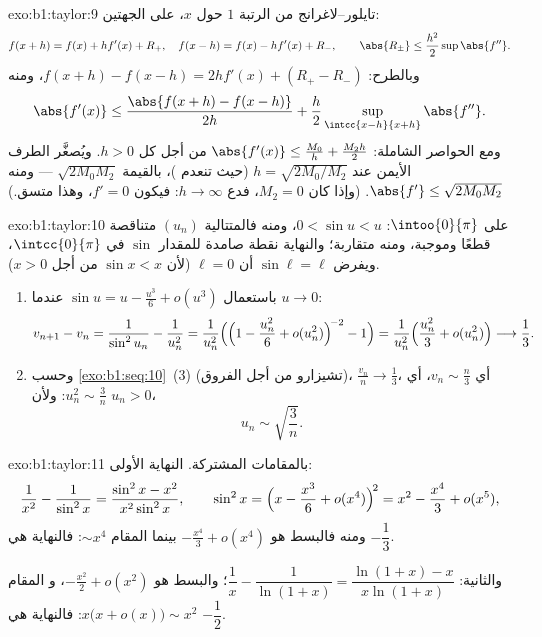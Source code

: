 \begin{solution}{exo:b1:taylor:9}
تايلور--لاغرانج من الرتبة $1$ حول $x$، على الجهتين:
\[
f(x + h) = f(x) + h f'(x) + R_+,\quad
f(x - h) = f(x) - h f'(x) + R_-,
\qquad \abs{R_\pm} \leq \frac{h^2}{2} \sup \abs{f''} .
\]
وبالطرح: $f(x+h) - f(x-h) = 2h f'(x) + (R_+ - R_-)$، ومنه
\[
\abs{f'(x)} \leq \frac{\abs{f(x+h) - f(x-h)}}{2h} +
\frac{h}{2}\sup_{\intcc{x-h}{x+h}}\abs{f''} .
\]
ومع الحواصر الشاملة: $\abs{f'(x)} \leq \frac{M_0}{h} + \frac{M_2
h}{2}$ من أجل كل $h > 0$. ويُصغَّر الطرف الأيمن عند $h =
\sqrt{2M_0/M_2}$ (حيث تنعدم )، بالقيمة $\sqrt{2M_0M_2}$
--- ومنه $\abs{f'} \leq \sqrt{2M_0M_2}$. (وإذا كان $M_2 = 0$، فدع $h \to
\infty$: فيكون $f' = 0$، وهذا متسق.)
\end{solution}

\begin{solution}{exo:b1:taylor:10}
على $\intoo{0}{\pi}$: $0 < \sin u < u$، ومنه فالمتتالية $(u_n)$ متناقصة
قطعًا وموجبة، ومنه متقاربة؛ والنهاية نقطة صامدة
للمقدار $\sin$ في $\intcc{0}{\pi}$، ويفرض $\sin \ell = \ell$ أن $\ell =
0$ (لأن $\sin x < x$ من أجل $x > 0$).
\begin{enumerate}
  \item باستعمال $\sin u = u - \frac{u^3}{6} + o(u^3)$ عندما $u \to 0$:
        \[
        v_{n+1} - v_n = \frac{1}{\sin^2 u_n} - \frac{1}{u_n^2}
        = \frac{1}{u_n^2}\Bigl(\Bigl(1 - \frac{u_n^2}{6} +
        o(u_n^2)\Bigr)^{\!-2} - 1\Bigr)
        = \frac{1}{u_n^2}\Bigl(\frac{u_n^2}{3} + o(u_n^2)\Bigr)
        \longrightarrow \frac13 .
        \]
  \item وحسب \cref{exo:b1:seq:10}~(3) (تشيزارو من أجل الفروق)،
        $\frac{v_n}{n} \to \frac13$، أي $v_n \sim \frac n3$، أي
        $u_n^2 \sim \frac 3n$: ولأن $u_n > 0$،
        \[
        u_n \sim \sqrt{\frac{3}{n}} .
        \]
\end{enumerate}
\end{solution}

\begin{solution}{exo:b1:taylor:11}
بالمقامات المشتركة. النهاية الأولى:
\[
\frac{1}{x^2} - \frac{1}{\sin^2 x}
= \frac{\sin^2 x - x^2}{x^2\sin^2 x},
\qquad
\sin^2 x = \Bigl(x - \frac{x^3}{6} + o(x^4)\Bigr)^{\!2}
= x^2 - \frac{x^4}{3} + o(x^5) ,
\]
ومنه فالبسط هو $-\frac{x^4}{3} + o(x^4)$ بينما
المقام $\sim x^4$: فالنهاية هي $-\dfrac13$.

والثانية: $\dfrac1x - \dfrac{1}{\ln(1+x)} = \dfrac{\ln(1+x) -
x}{x\ln(1+x)}$؛ والبسط هو $-\frac{x^2}{2} + o(x^2)$، و
المقام $x\bigl(x + o(x)\bigr) \sim x^2$: فالنهاية هي
$-\dfrac12$.
\end{solution}

